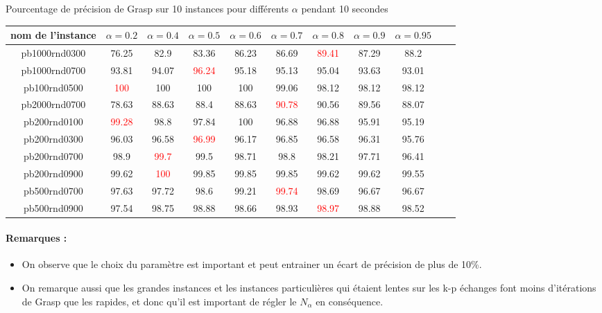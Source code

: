 Pourcentage de précision de Grasp sur 10 instances pour différents $\alpha$ pendant 10 secondes
\begin{center}
    \begin{tabular}{|c|c|c|c|c|c|c|c|c|c|c|}  
    \hline
    nom de l'instance &  $\alpha=0.2$ &  $\alpha=0.4$ &  $\alpha=0.5$ &  $\alpha=0.6$ & $\alpha=0.7$ &  $\alpha=0.8$ &  $\alpha=0.9$ &  $\alpha=0.95$ \\
     \hline
     pb1000rnd0300 & 76.25 & 82.9 & 83.36 & 86.23 & 86.69 & \textcolor{red}{89.41} & 87.29 & 88.2\\
     \hline
     pb1000rnd0700 & 93.81 & 94.07 & \textcolor{red}{96.24} & 95.18 & 95.13 & 95.04 & 93.63 & 93.01\\
     \hline
     pb100rnd0500 & \textcolor{red}{100} & 100 & 100 & 100 & 99.06 & 98.12 & 98.12 & 98.12\\
     \hline
     pb2000rnd0700 & 78.63 & 88.63 & 88.4 & 88.63 & \textcolor{red}{90.78} & 90.56 & 89.56 & 88.07\\
     \hline
     pb200rnd0100 & \textcolor{red}{99.28} & 98.8 & 97.84 & 100 & 96.88 & 96.88 & 95.91 & 95.19\\
     \hline
     pb200rnd0300 & 96.03 & 96.58 & \textcolor{red}{96.99} & 96.17 & 96.85 & 96.58 & 96.31 & 95.76\\
     \hline
     pb200rnd0700 & 98.9 & \textcolor{red}{99.7} & 99.5 & 98.71 & 98.8 & 98.21 & 97.71 & 96.41\\
     \hline
     pb200rnd0900 & 99.62 & \textcolor{red}{100} & 99.85 & 99.85 & 99.85 & 99.62 & 99.62 & 99.55\\
     \hline 
     pb500rnd0700 & 97.63 & 97.72 & 98.6 & 99.21 & \textcolor{red}{99.74} & 98.69 & 96.67 & 96.67\\
     \hline 
     pb500rnd0900 & 97.54 & 98.75 & 98.88 & 98.66 & 98.93 & \textcolor{red}{98.97} & 98.88 & 98.52\\
     \hline
    \end{tabular}
\end{center}


\paragraph{Remarques : }
\begin{itemize}
\item On observe que le choix du paramètre est important et peut entrainer un écart de précision de plus de 10\%.

\item On remarque aussi que les grandes instances et les instances particulières qui étaient lentes sur les k-p échanges font moins d'itérations de Grasp que les rapides, et donc qu'il est important de régler le $N_{\alpha}$ en conséquence. 
\end{itemize}


